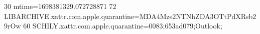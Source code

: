 30 mtime=1698381329.072728871
72 LIBARCHIVE.xattr.com.apple.quarantine=MDA4Mzs2NTNhZDA3OTtPdXRsb29rOw
60 SCHILY.xattr.com.apple.quarantine=0083;653ad079;Outlook;
